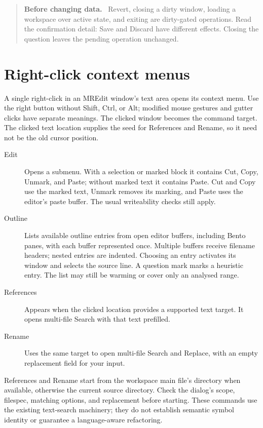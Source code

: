 \documentclass[a4paper,10pt,twoside,openany]{book}
\newenvironment{usersafety}{\begin{quote}\small\textbf{Before changing data.}\ }{\end{quote}}
\begin{document}
\begin{usersafety}
Revert, closing a dirty window, loading a workspace over active state, and
exiting are dirty-gated operations. Read the confirmation detail: Save and
Discard have different effects. Closing the question leaves the pending
operation unchanged.
\end{usersafety}

\section{Right-click context menus}
\label{sec:users-editor-context}

A single right-click in an MREdit window's text area opens its context menu.
Use the right button without Shift, Ctrl, or Alt; modified mouse gestures and
gutter clicks have separate meanings. The clicked window becomes the command
target. The clicked text location supplies the seed for References and Rename,
so it need not be the old cursor position.

\begin{description}
\item[Edit] Opens a submenu. With a selection or marked block it contains
Cut, Copy, Unmark, and Paste; without marked text it contains Paste.
Cut and Copy use the marked text, Unmark removes its marking, and Paste uses
the editor's paste buffer. The usual writeability checks still apply.
\item[Outline] Lists available outline entries from open editor buffers,
including Bento panes, with each buffer represented once. Multiple buffers
receive filename headers; nested entries are indented. Choosing an entry
activates its window and selects the source line. A question mark marks a
heuristic entry. The list may still be warming or cover only an analysed range.
\item[References] Appears when the clicked location provides a supported
text target. It opens multi-file Search with that text prefilled.
\item[Rename] Uses the same target to open multi-file Search and Replace,
with an empty replacement field for your input.
\end{description}

References and Rename start from the workspace main file's directory when
available, otherwise the current source directory. Check the dialog's scope,
filespec, matching options, and replacement before starting. These commands
use the existing text-search machinery; they do not establish semantic symbol
identity or guarantee a language-aware refactoring.
\end{document}

